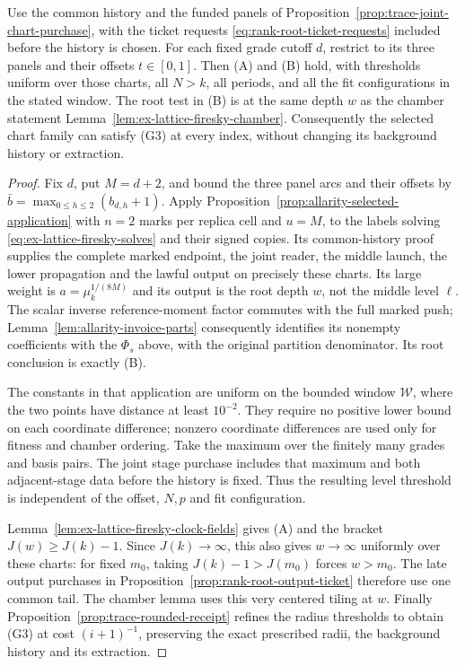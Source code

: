 \begin{corollary}
\label{prop:trace-selected-rounded-receipt}
Use the common history and the funded panels of
Proposition~\ref{prop:trace-joint-chart-purchase}, with the ticket requests
\eqref{eq:rank-root-ticket-requests} included before the history is
chosen. For each fixed grade cutoff $d$, restrict to its three panels
and their offsets $t\in[0,1]$. Then (A) and (B) hold, with thresholds
uniform over those charts, all $N>k$, all periods, and all the fit
configurations in the stated window. The root test in (B) is at the
same depth $w$ as the chamber statement
Lemma~\ref{lem:ex-lattice-firesky-chamber}.
Consequently the selected chart family can satisfy (G3) at every index,
without changing its background history or extraction.
\end{corollary}
\begin{proof}
Fix $d$, put $M=d+2$, and bound the three panel arcs and their offsets
by $\bar b=\max_{0\le h\le2}(b_{d,h}+1)$. Apply
Proposition~\ref{prop:allarity-selected-application} with $n=2$ marks
per replica cell and $u=M$, to the labels solving
\eqref{eq:ex-lattice-firesky-solves} and their signed copies. Its
common-history proof supplies the complete marked endpoint, the joint
reader, the middle launch, the lower propagation and the lawful output
on precisely these charts. Its large weight is
$a=\mu_k^{1/(8M)}$ and its output is the root depth $w$, not the middle
level $\ell$. The scalar inverse reference-moment factor commutes with
the full marked push; Lemma~\ref{lem:allarity-invoice-parts} consequently
identifies its nonempty coefficients with the $\Phi_s$ above, with the
original partition denominator. Its root conclusion is exactly (B).

The constants in that application are uniform on the bounded window
$\mathcal W$, where the two points have distance at least $10^{-2}$.
They require no positive lower bound on each coordinate difference;
nonzero coordinate differences are used only for fitness and chamber
ordering. Take the maximum over the finitely many grades and basis
pairs. The joint stage purchase includes that maximum and both
adjacent-stage data before the history is fixed. Thus the resulting
level threshold is independent of the offset, $N,p$ and fit configuration.

Lemma~\ref{lem:ex-lattice-firesky-clock-fields} gives (A) and the
bracket $J(w)\ge J(k)-1$. Since $J(k)\to\infty$, this also gives
$w\to\infty$ uniformly over these charts: for fixed $m_0$, taking
$J(k)-1>J(m_0)$ forces $w>m_0$. The late output purchases in
Proposition~\ref{prop:rank-root-output-ticket} therefore use one
common tail. The chamber lemma uses this very centered tiling at $w$.
Finally Proposition~\ref{prop:trace-rounded-receipt} refines the radius
thresholds to obtain (G3) at cost $(i+1)^{-1}$, preserving the exact
prescribed radii, the background history and its extraction.
\end{proof}

